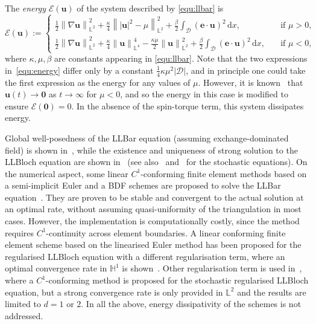 \documentclass[11pt, reqno]{amsart}
\theoremstyle{definition}
\theoremstyle{remark}
\numberwithin{equation}{section}
\newcommand{\bff}{\boldsymbol}
\newcommand{\bb}{\mathbb}
\newcommand{\dx}{\mathrm{d}x}
\newcommand{\norm}[2]{\left\|{#1}\right\|_{#2}}
\begin{document}
The \emph{energy} $\mathcal{E}(\bff{u})$ of the system described by \eqref{equ:llbar} is 
\begin{equation}\label{equ:energy}
	\mathcal{E}(\bff{u})
	:=
	\begin{cases}
	\displaystyle
	\frac{1}{2} \norm{\nabla \bff{u}}{\bb{L}^2}^2
	+
	\frac{\kappa}{4} \norm{|\bff{u}|^2-\mu}{\bb{L}^2}^2
	+
	\frac{\beta}{2} \int_\mathscr{D} (\bff{e}\cdot \bff{u})^2\, \dx,
	\quad & \text{if } \mu>0,
	\\[3mm]
	\displaystyle
	\frac{1}{2} \norm{\nabla \bff{u}}{\bb{L}^2}^2
	+
	\frac{\kappa}{4} \norm{\bff{u}}{\bb{L}^4}^4
	-
	\frac{\kappa\mu}{2} \norm{\bff{u}}{\bb{L}^2}^2
	+
	\frac{\beta}{2} \int_\mathscr{D} (\bff{e}\cdot \bff{u})^2\, \dx,
	\quad & \text{if } \mu< 0,
	\end{cases}
\end{equation}
where $\kappa, \mu, \beta$ are constants appearing in \eqref{equ:llbar}. Note that the two expressions in~\eqref{equ:energy} differ only by a constant $\frac{1}{4} \kappa \mu^2 |\mathscr{D}|$, and in principle one could take the first expression as the energy for any values of $\mu$. However, it is known~\cite{LeSoeTra24} that $\bff{u}(t)\to \bff{0}$ as $t\to\infty$ for $\mu< 0$, and so the energy in this case is modified to ensure $\mathcal{E}(\bff{0})= 0$. In the absence of the spin-torque term, this system dissipates energy.

\par \medskip

Global well-posedness of the LLBar equation (assuming exchange-dominated field) is shown in~\cite{SoeTra23}, while the existence and uniqueness of strong solution to the LLBloch equation are shown in~\cite{Le16, LeSoeTra24} (see also~\cite{BrzGolLe20} and~\cite{GolSoeTra24b} for the stochastic equations). On the numerical aspect, some linear $C^1$-conforming finite element methods based on a semi-implicit Euler and a BDF schemes are proposed to solve the LLBar equation~\cite{SoeTra23b}. They are proven to be stable and convergent to the actual solution at an optimal rate, without assuming quasi-uniformity of the triangulation in most cases. However, the implementation is computationally costly, since the method requires $C^1$-continuity across element boundaries. A linear conforming finite element scheme based on the linearised Euler method has been proposed for the regularised LLBloch equation with a different regularisation term, where an optimal convergence rate in $\bb{H}^1$ is shown~\cite{LeSoeTra24}. Other regularisation term is used in~\cite{GolJiaLe22}, where a $C^1$-conforming method is proposed for the stochastic regularised LLBloch equation, but a strong convergence rate is only provided in $\bb{L}^2$ and the results are limited to $d=1$ or $2$. In all the above, energy dissipativity of the schemes is not addressed.
\end{document}
